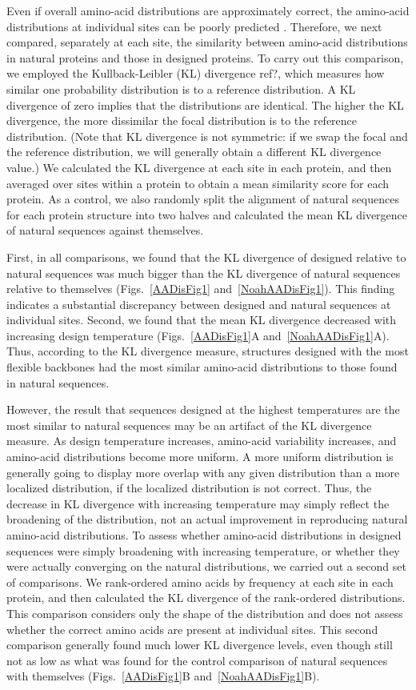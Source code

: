\documentclass[12pt]{article}
\begin{document}
Even if overall amino-acid distributions are approximately correct, the amino-acid distributions at individual sites can be poorly predicted \citep{Ramsey2011}. Therefore, we next compared, separately at each site, the similarity between amino-acid distributions in natural proteins and those in designed proteins. To carry out this comparison, we employed the Kullback-Leibler (KL) divergence {\color{red}ref?}, which measures how similar one probability distribution is to a reference distribution. A KL divergence of zero implies that the distributions are identical. The higher the KL divergence, the more dissimilar the focal distribution is to the reference distribution. (Note that KL divergence is not symmetric: if we swap the focal and the reference distribution, we will generally obtain a different KL divergence value.) We calculated the KL divergence at each site in each protein, and then averaged over sites within a protein to obtain a mean similarity score for each protein. As a control, we also randomly split the alignment of natural sequences for each protein structure into two halves and calculated the mean KL divergence of natural sequences against themselves.

First, in all comparisons, we found that the KL divergence of designed relative to natural sequences was much bigger than the KL divergence of natural sequences relative to themselves (Figs.~\ref{AADisFig1} and~\ref{NoahAADisFig1}). This finding indicates a substantial discrepancy between designed and natural sequences at individual sites. Second, we found that the mean KL divergence decreased with increasing design temperature (Figs.~\ref{AADisFig1}A and~\ref{NoahAADisFig1}A). Thus, according to the KL divergence measure, structures designed with the most flexible backbones had the most similar amino-acid distributions to those found in natural sequences.

However, the result that sequences designed at the highest temperatures are the most similar to natural sequences may be an artifact of the KL divergence measure. As design temperature increases, amino-acid variability increases, and amino-acid distributions become more uniform. A more uniform distribution is generally going to display more overlap with any given distribution than a more localized distribution, if the localized distribution is not correct. Thus, the decrease in KL divergence with increasing temperature may simply reflect the broadening of the distribution, not an actual improvement in reproducing natural amino-acid distributions. To assess whether amino-acid distributions in designed sequences were simply broadening with increasing temperature, or whether they were actually converging on the natural distributions, we carried out a second set of comparisons. We rank-ordered amino acids by frequency at each site in each protein, and then calculated the KL divergence of the rank-ordered distributions. This comparison considers only the shape of the distribution and does not assess whether the correct amino acids are present at individual sites. This second comparison generally found much lower KL divergence levels, even though still not as low as what was found for the control comparison of natural sequences with themselves (Figs.~\ref{AADisFig1}B and~\ref{NoahAADisFig1}B). 
\end{document}
